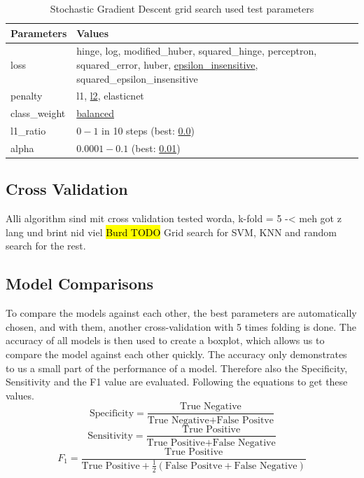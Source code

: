 \documentclass[11pt]{article}
\renewcommand{\arraystretch}{1.3}
\begin{document}
	\begin{table}[H]
		\renewcommand{\arraystretch}{1.3}
		\centering
		\begin{tabularx}{\textwidth}{lX}
			Parameters & Values \\
			\toprule
			loss &  hinge, log, modified\_huber, squared\_hinge, perceptron, squared\_error, huber, \underline{epsilon\_insensitive}, squared\_epsilon\_insensitive\\
			penalty & l1, \underline{l2}, elasticnet   \\
			class\_weight & \underline{balanced}\\
			l1\_ratio & $0-1$ in 10 steps (best: \underline{0.0})\\
			alpha & $0.0001 - 0.1$ (best: \underline{0.01})\\
		\end{tabularx}
		\caption{Stochastic Gradient Descent grid search used test parameters}
		\label{tab:SGDParameters}
	\end{table}

	
	\subsection{Cross Validation}
	Alli algorithm sind mit cross validation tested worda, k-fold = 5 -< meh got z lang und brint nid viel
	\hl{Burd TODO}
	Grid search for SVM, KNN and random search for the rest.
	
	\subsection{Model Comparisons}
	To compare the models against each other, the best parameters are automatically chosen, and with them, another cross-validation with 5 times folding is done.
	The accuracy of all models is then used to create a boxplot, which allows us to compare the model against each other quickly. The accuracy only demonstrates to us a small part of the performance of a model. Therefore also the Specificity, Sensitivity and the F1 value are evaluated. Following the equations to get these values.
	$$ 
	\text{Specificity} = \frac{\text{True Negative}}{\text{True Negative} + \text{False Positve}} $$
	$$
	\text{Sensitivity} = \frac{\text{True Positive}}{\text{True Positive} + \text{False Negative}}
	$$	
	$$
	F_{1}=\frac{\text{True Positive}}{\text{True Positive} + \frac{1}{2}(\text{False Positve} + \text{False Negative})}
	$$
\end{document}
